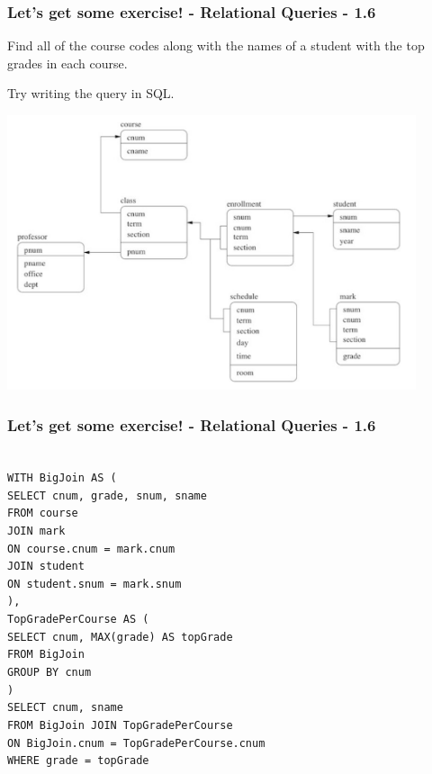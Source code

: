 \begin{frame}
\frametitle{Let's get some exercise! - Relational Queries - 1.6}

Find all of the course codes along with the names of a student with the top grades in each course.

Try writing the query in SQL.

\begin{center}
  \includegraphics[width=0.9\textwidth]{images/db-schema.png}
\end{center}

\end{frame}


\begin{frame}
\frametitle{Let's get some exercise! - Relational Queries - 1.6}


\texttt{ \\
  WITH BigJoin AS ( \\
    SELECT cnum, grade, snum, sname \\
    FROM course \\
    JOIN mark \\
    ON course.cnum = mark.cnum \\
    JOIN student \\
    ON student.snum = mark.snum \\
  ), \\
  TopGradePerCourse AS ( \\
    SELECT cnum, MAX(grade) AS topGrade \\
    FROM BigJoin \\
    GROUP BY cnum \\
  ) \\
  SELECT cnum, sname \\
  FROM BigJoin
  JOIN TopGradePerCourse \\
  ON BigJoin.cnum = TopGradePerCourse.cnum \\
  WHERE grade = topGrade
}

\end{frame}


